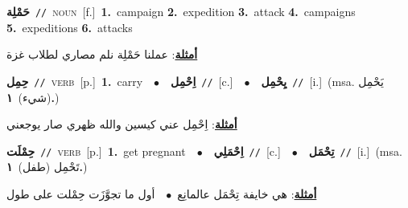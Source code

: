 \documentclass[10pt,a4paper,twoside]{article} %
\begin{document}
\begin{multicols}{2}
{\setlength\topsep{0pt}\textbf{\foreignlanguage{arabic}{حَمْلِة}}\ {\color{gray}\texttt{//}\color{black}}\ \textsc{noun}\ [f.]\ \textbf{1.}~campaign  \textbf{2.}~expedition  \textbf{3.}~attack  \textbf{4.}~campaigns  \textbf{5.}~expeditions  \textbf{6.}~attacks\  \begin{flushright}\color{gray}\foreignlanguage{arabic}{\textbf{\underline{\foreignlanguage{arabic}{أمثلة}}}: عملنا حَمْلِة نلم مصاري لطلاب غزة}\end{flushright}\color{black}} \vspace{2mm}

{\setlength\topsep{0pt}\textbf{\foreignlanguage{arabic}{حِمِل}}\ {\color{gray}\texttt{//}\color{black}}\ \textsc{verb}\ [p.]\ \textbf{1.}~carry\ \ $\bullet$\ \ \setlength\topsep{0pt}\textbf{\foreignlanguage{arabic}{اِحْمِل}}\ {\color{gray}\texttt{//}\color{black}}\ [c.]\ \ $\bullet$\ \ \setlength\topsep{0pt}\textbf{\foreignlanguage{arabic}{يِحْمِل}}\ {\color{gray}\texttt{//}\color{black}}\ [i.]\ \color{gray}(msa. \foreignlanguage{arabic}{يَحْمِل (شيء)}~\foreignlanguage{arabic}{\textbf{١.}})\color{black}\  \begin{flushright}\color{gray}\foreignlanguage{arabic}{\textbf{\underline{\foreignlanguage{arabic}{أمثلة}}}: اِحْمِل عني كيسين والله ظهري صار يوجعني}\end{flushright}\color{black}} \vspace{2mm}

{\setlength\topsep{0pt}\textbf{\foreignlanguage{arabic}{حِمْلَت}}\ {\color{gray}\texttt{//}\color{black}}\ \textsc{verb}\ [p.]\ \textbf{1.}~get pregnant\ \ $\bullet$\ \ \setlength\topsep{0pt}\textbf{\foreignlanguage{arabic}{اِحْمَلِي}}\ {\color{gray}\texttt{//}\color{black}}\ [c.]\ \ $\bullet$\ \ \setlength\topsep{0pt}\textbf{\foreignlanguage{arabic}{تِحْمَل}}\ {\color{gray}\texttt{//}\color{black}}\ [i.]\ \color{gray}(msa. \foreignlanguage{arabic}{تَحْمِل (طفل)}~\foreignlanguage{arabic}{\textbf{١.}})\color{black}\  \begin{flushright}\color{gray}\foreignlanguage{arabic}{\textbf{\underline{\foreignlanguage{arabic}{أمثلة}}}: هي خايفة تِحْمَل عالمانِع\ $\bullet$\ \  أول ما تجوَّزَت حِمْلت على طول}\end{flushright}\color{black}} \vspace{2mm}


\end{multicols}
\end{document}

